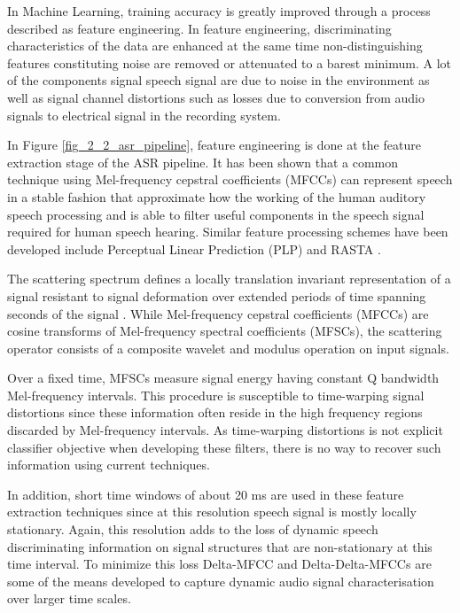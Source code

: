 {In Machine Learning, training accuracy is greatly improved through a process described as feature engineering.  In feature engineering, discriminating characteristics of the data are enhanced at the same time non-distinguishing features constituting noise are removed or attenuated to a barest minimum.  A lot of the components signal speech signal are due to noise in the environment as well as signal channel distortions such as losses due to conversion from audio signals to electrical signal in the recording system.

In Figure \ref{fig_2_2_asr_pipeline}, feature engineering is done at the feature extraction stage of the ASR pipeline. It has been shown that a common technique using Mel-frequency cepstral coefficients (MFCCs) \citep{davis1980comparison} can represent speech in a stable fashion that approximate how the working of the human auditory speech processing and is able to filter useful components in the speech signal required for human speech hearing. Similar feature processing schemes have been developed include Perceptual Linear Prediction (PLP) \citep{hermansky1990perceptual} and RASTA \citep{hermansky1994rasta}. 

The scattering spectrum defines a locally translation invariant representation of a signal resistant to signal deformation over extended periods of time spanning seconds of the signal \citep{anden2014deep}. While Mel-frequency cepstral coefficients (MFCCs) are cosine transforms of Mel-frequency spectral coefficients (MFSCs), the scattering operator consists of a composite wavelet and modulus operation on input signals. 

Over a fixed time, MFSCs measure signal energy having constant Q bandwidth Mel-frequency intervals.  This procedure is susceptible to time-warping signal distortions since these information often reside in the high frequency regions discarded by Mel-frequency intervals.  As time-warping distortions is not explicit classifier objective when developing these filters, there is no way to recover such information using current techniques. 

In addition, short time windows of about 20 ms are used in these feature extraction techniques since at this resolution speech signal is mostly locally stationary.  Again, this resolution adds to the loss of dynamic speech discriminating information on signal structures that are non-stationary at this time interval. To minimize this loss Delta-MFCC and Delta-Delta-MFCCs \citep{furui1986speaker} are some of the means developed to capture dynamic audio signal characterisation over  larger time scales.

}
